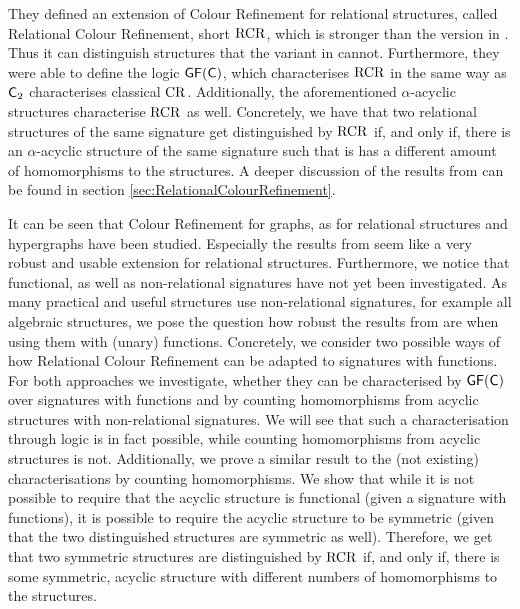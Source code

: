 They defined an extension of Colour Refinement for relational structures, called Relational Colour Refinement, short $\operatorname{RCR}$, which is stronger than the version in \cite{butti2021FractionalHomomorphism}.
Thus it can distinguish structures that the variant in \cite{butti2021FractionalHomomorphism} cannot.
Furthermore, they were able to define the logic $\mathsf{GF}(\mathsf{C})$, which characterises $\operatorname{RCR}$ in the same way as $\mathsf{C}_{2}$ characterises classical $\operatorname{CR}$.
Additionally, the aforementioned $\alpha$-acyclic structures characterise $\operatorname{RCR}$ as well.
Concretely, we have that two relational structures of the same signature get distinguished by $\operatorname{RCR}$ if, and only if, there is an $\alpha$-acyclic structure of the same signature such that is has a different amount of homomorphisms to the structures.
A deeper discussion of the results from \cite{scheidt2025ColorRefinement} can be found in section \ref{sec:RelationalColourRefinement}.


It can be seen that Colour Refinement for graphs, as for relational structures and hypergraphs have been studied.
Especially the results from \cite{scheidt2025ColorRefinement} seem like a very robust and usable extension for relational structures.
Furthermore, we notice that functional, as well as non-relational signatures have not yet been investigated.
As many practical and useful structures use non-relational signatures, for example all algebraic structures, we pose the question how robust the results from \cite{scheidt2025ColorRefinement} are when using them with (unary) functions.
Concretely, we consider two possible ways of how Relational Colour Refinement can be adapted to signatures with functions.
For both approaches we investigate, whether they can be characterised by $\mathsf{GF}(\mathsf{C})$ over signatures with functions and by counting homomorphisms from acyclic structures with non-relational signatures.
We will see that such a characterisation through logic is in fact possible, while counting homomorphisms from acyclic structures is not.
Additionally, we prove a similar result to the (not existing) characterisations by counting homomorphisms.
We show that while it is not possible to require that the acyclic structure is functional (given a signature with functions), it is possible to require the acyclic structure to be symmetric (given that the two distinguished structures are symmetric as well).
Therefore, we get that two symmetric structures are distinguished by $\operatorname{RCR}$ if, and only if, there is some symmetric, acyclic structure with different numbers of homomorphisms to the structures.


